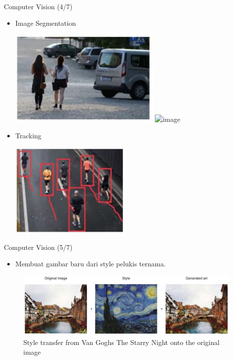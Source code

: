 \documentclass[pdf]{beamer}
\theoremstyle{mystyle}
\begin{document}
\begin{frame}{Computer Vision (4/7)}
	\begin{itemize}
		\item Image Segmentation
		\begin{center}
			\includegraphics[scale=.4]{object-detection-1} \qquad \includegraphics<2->[scale=.4]{image-segmentation}	
		\end{center}
		\item<3-> Tracking
		\begin{center}
			\includegraphics[scale=.4]{tracking}
		\end{center}
	\end{itemize}
\end{frame}

\begin{frame}{Computer Vision (5/7)}
	\begin{itemize}
		\item Membuat gambar baru dari style pelukis ternama.
	\end{itemize}	
\begin{figure}[!ht]
	\centering
\includegraphics[scale=.2]{images/generating-style}
\caption{Style transfer from Van Goghs The Starry Night onto the original image \citep{elgendy2020deeplearning4vision}}
\end{figure}		
\end{frame}
\end{document}
